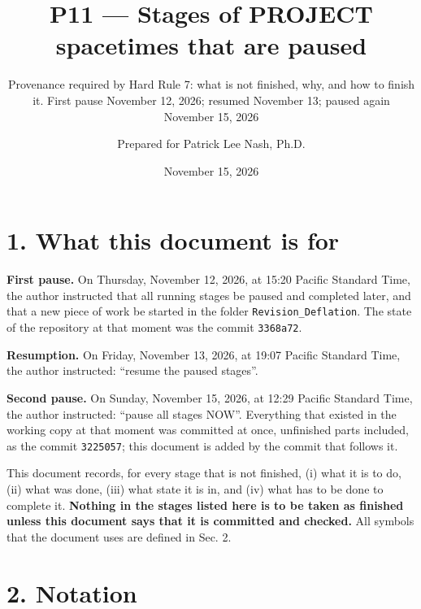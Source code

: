 \documentclass[
  10pt,
]{article}
\title{P11 --- Stages of PROJECT spacetimes that are paused}
\subtitle{Provenance required by Hard Rule 7: what is not finished, why,
and how to finish it. First pause November 12, 2026; resumed November
13; paused again November 15, 2026}
\author{Prepared for Patrick Lee Nash, Ph.D.}
\date{November 15, 2026}
\begin{document}
\maketitle

\hypertarget{what-this-document-is-for}{%
\section{1. What this document is for}\label{what-this-document-is-for}}

\textbf{First pause.} On Thursday, November 12, 2026, at 15:20 Pacific
Standard Time, the author instructed that all running stages be paused
and completed later, and that a new piece of work be started in the
folder \texttt{Revision\_Deflation}. The state of the repository at that
moment was the commit \texttt{3368a72}.

\textbf{Resumption.} On Friday, November 13, 2026, at 19:07 Pacific
Standard Time, the author instructed: ``resume the paused stages''.

\textbf{Second pause.} On Sunday, November 15, 2026, at 12:29 Pacific
Standard Time, the author instructed: ``pause all stages NOW''.
Everything that existed in the working copy at that moment was committed
at once, unfinished parts included, as the commit \texttt{3225057}; this
document is added by the commit that follows it.

This document records, for every stage that is not finished, (i) what it
is to do, (ii) what was done, (iii) what state it is in, and (iv) what
has to be done to complete it. \textbf{Nothing in the stages listed here
is to be taken as finished unless this document says that it is
committed and checked.} All symbols that the document uses are defined
in Sec. 2.

\hypertarget{notation}{%
\section{2. Notation}\label{notation}}
\end{document}
